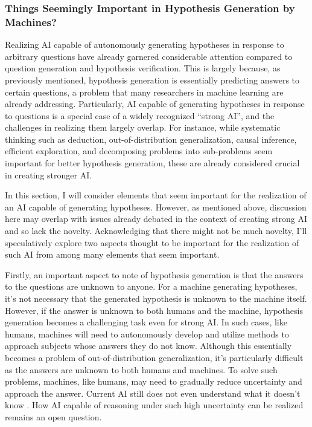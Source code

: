 \subsubsection{Things Seemingly Important in Hypothesis Generation by Machines?}

Realizing AI capable of autonomously generating hypotheses in response to arbitrary questions have already garnered considerable attention compared to question generation and hypothesis verification. This is largely because, as previously mentioned, hypothesis generation is essentially predicting answers to certain questions, a problem that many researchers in machine learning are already addressing. Particularly, AI capable of generating hypotheses in response to questions is a special case of a widely recognized ``strong AI'', and the challenges in realizing them largely overlap. For instance, while systematic thinking such as deduction, out-of-distribution generalization, causal inference, efficient exploration, and decomposing problems into sub-problems seem important for better hypothesis generation, these are already considered crucial in creating stronger AI.

In this section, I will consider elements that seem important for the realization of an AI capable of generating hypotheses. However, as mentioned above, discussion here may overlap with issues already debated in the context of creating strong AI and so lack the novelty. Acknowledging that there might not be much novelty, I'll speculatively explore two aspects thought to be important for the realization of such AI from among many elements that seem important. 

Firstly, an important aspect to note of hypothesis generation is that the answers to the questions are unknown to anyone. For a machine generating hypotheses, it's not necessary that the generated hypothesis is unknown to the machine itself. However, if the answer is unknown to both humans and the machine, hypothesis generation becomes a challenging task even for strong AI. In such cases, like humans, machines will need to autonomously develop and utilize methods to approach subjects whose answers they do not know. Although this essentially becomes a problem of out-of-distribution generalization, it's particularly difficult as the answers are unknown to both humans and machines. To solve such problems, machines, like humans, may need to gradually reduce uncertainty and approach the answer. Current AI still does not even understand what it doesn't know \cite{guo2017calibration,maynez2020faithfulness}. How AI capable of reasoning under such high uncertainty can be realized remains an open question.

